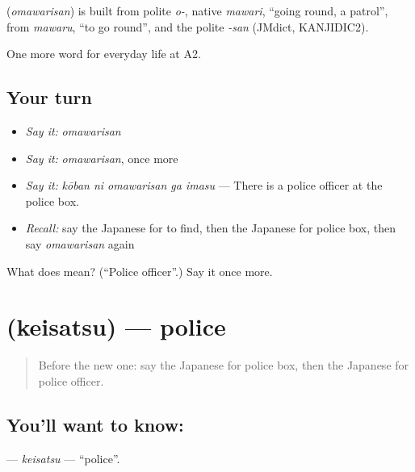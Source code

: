 \begin{cousinweb}
\textbf{} (\emph{omawarisan}) is built from polite \emph{o-}, native \emph{mawari}, \textquotedblleft{}going round, a patrol\textquotedblright{}, from \emph{mawaru}, \textquotedblleft{}to go round\textquotedblright{}, and the polite \emph{-san} (JMdict, KANJIDIC2).
\end{cousinweb}

\begin{grammarlens}[title={What you've built}]
One more word for everyday life at A2.
\end{grammarlens}

\subsection*{Your turn}
\begin{itemize}
\raggedright
  \item \emph{Say it:} \emph{omawarisan}
  \item \emph{Say it:} \emph{omawarisan}, once more
  \item \emph{Say it:} \emph{kōban ni omawarisan ga imasu} — There is a police officer at the police box.
  \item \emph{Recall:} say the Japanese for to find, then the Japanese for police box, then say \emph{omawarisan} again
\end{itemize}

\begin{tcolorbox}[breakable,colback=teal!4,colframe=teal!35!black,title={Before you move on}]
What does  mean? (\textquotedblleft{}Police officer\textquotedblright{}.) Say it once more.
\end{tcolorbox}
\section[\texorpdfstring{\ja{けいさつ} (keisatsu)}{けいさつ (keisatsu)}]{ (keisatsu) — police}

\label{lesson:JA-C192-keisatsu}



\begin{quote}
Before the new one: say the Japanese for police box, then the Japanese for police officer.
\end{quote}

\subsection*{You'll want to know: }
\textbf{} — \emph{keisatsu} — \textquotedblleft{}police\textquotedblright{}.


